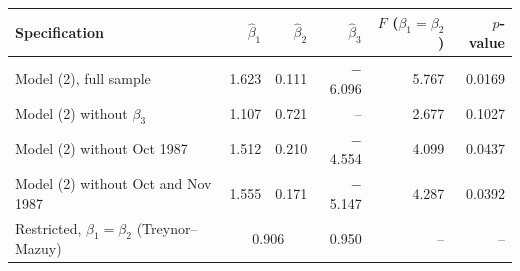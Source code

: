 \begin{tabular}{lrrrrr}
\toprule
Specification & $\hat\beta_1$ & $\hat\beta_2$ & $\hat\beta_3$ & $F$ ($\beta_1=\beta_2$) & $p$-value \\
\midrule
Model (2), full sample & 1.623 & 0.111 & \ensuremath{-}6.096 & 5.767 & 0.0169 \\
Model (2) without $\beta_3$ & 1.107 & 0.721 & -- & 2.677 & 0.1027 \\
Model (2) without Oct 1987 & 1.512 & 0.210 & \ensuremath{-}4.554 & 4.099 & 0.0437 \\
Model (2) without Oct and Nov 1987 & 1.555 & 0.171 & \ensuremath{-}5.147 & 4.287 & 0.0392 \\
\midrule
Restricted, $\beta_1=\beta_2$ (Treynor--Mazuy) & \multicolumn{2}{c}{0.906} & 0.950 & -- & -- \\
\bottomrule
\end{tabular}
